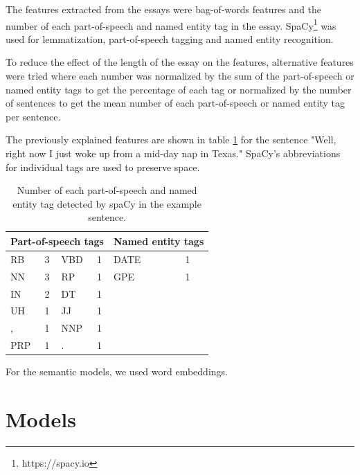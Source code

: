 \documentclass[10pt, a4paper]{article}
\begin{document}
The features extracted from the essays were bag-of-words features and the number of each part-of-speech and named entity tag in the essay.
SpaCy\footnote{https://spacy.io} was used for lemmatization, part-of-speech tagging and named entity recognition.

To reduce the effect of the length of the essay on the features, alternative features were tried where each number was normalized by the sum of the part-of-speech or named entity tags to get the percentage of each tag or normalized by the number of sentences to get the mean number of each part-of-speech or named entity tag per sentence.

The previously explained features are shown in table \ref{example features} for the sentence "Well, right now I just woke up from a mid-day nap in Texas."
SpaCy's abbreviations for individual tags are used to preserve space.

\begin{table}[H]
	\centering
	\caption{Number of each part-of-speech and named entity tag detected by spaCy in the example sentence.}
	\begin{tabular}{llllll}
		\toprule
		\multicolumn{4}{l}{Part-of-speech tags} & \multicolumn{2}{l}{Named entity tags} \\ \midrule
		RB        & 3       & VBD      & 1      & DATE                & 1               \\
		NN        & 3       & RP       & 1      & GPE                 & 1               \\ \cline{5-6} 
		IN        & 2       & DT       & 1      &                     &                 \\
		UH        & 1       & JJ       & 1      &                     &                 \\
		,         & 1       & NNP      & 1      &                     &                 \\
		PRP       & 1       & .        & 1      &                     &                 \\ \cline{1-4}
	\end{tabular}
	\label{example features}
\end{table}

For the semantic models, we used word embeddings.

\section{Models}
\end{document}
